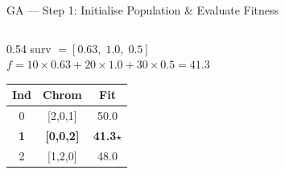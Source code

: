 \documentclass[aspectratio=169]{beamer}
\begin{document}
\begin{frame}{GA --- Step 1: Initialise Population \& Evaluate Fitness}
\begin{columns}[T]
\begin{column}{0.54\textwidth}
      {\small surv $= [0.63,\;1.0,\;0.5]$}\\[4pt]
      {\small $f = 10{\times}0.63 + 20{\times}1.0 + 30{\times}0.5
        = \mathbf{41.3}$}

      \vspace{0.3cm}
      \begin{tabular}{ccc}
        \toprule
        \rowcolor{navy}
          \color{white}\bfseries Ind &
          \color{white}\bfseries Chrom &
          \color{white}\bfseries Fit \\
        \midrule
        0 & [2,0,1] & 50.0 \\
        \rowcolor{lightgreen}
        \bfseries 1 & \bfseries[0,0,2] &
          \cellcolor{mygreen}\color{white}\bfseries 41.3$\star$ \\
        2 & [1,2,0] & 48.0 \\
        \bottomrule
      \end{tabular}
    \end{column}
  \end{columns}
\end{frame}
\end{document}
